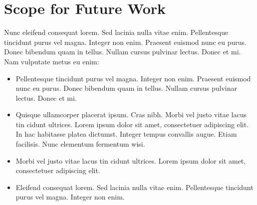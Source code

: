 
\section{Scope for Future Work}
Nunc eleifend consequat lorem. Sed lacinia nulla vitae enim. Pellentesque tincidunt purus vel magna. Integer non enim. Praesent euismod nunc eu purus. Donec bibendum quam in tellus. Nullam cursus pulvinar lectus. Donec et mi. Nam vulputate metus eu enim:

\begin{itemize}

    \item Pellentesque tincidunt purus vel magna. Integer non enim. Praesent euismod nunc eu purus. Donec bibendum quam in tellus. Nullam cursus pulvinar lectus. Donec et mi.
    
    \item Quisque ullamcorper placerat ipsum. Cras nibh. Morbi vel justo vitae lacus tin cidunt ultrices. Lorem ipsum dolor sit amet, consectetuer adipiscing elit. In hac habitasse platea dictumst. Integer tempus convallis augue. Etiam facilisis. Nunc elementum fermentum wisi.
    
    \item Morbi vel justo vitae lacus tin cidunt ultrices. Lorem ipsum dolor sit amet, consectetuer adipiscing elit.
    
    \item Eleifend consequat lorem. Sed lacinia nulla vitae enim. Pellentesque tincidunt purus vel magna. Integer non enim.

\end{itemize}
